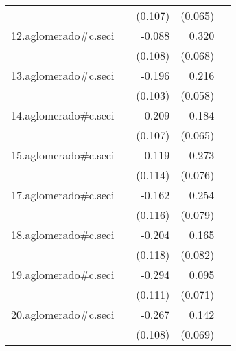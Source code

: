 {\begin{longtable}{l*{4}{D{.}{.}{-1}}}
            &                     &     (0.107)         &     (0.065)         &                     \\
\addlinespace
12.aglomerado#c.seci&                     &      -0.088         &       0.320\sym{***}&                     \\
            &                     &     (0.108)         &     (0.068)         &                     \\
\addlinespace
13.aglomerado#c.seci&                     &      -0.196         &       0.216\sym{***}&                     \\
            &                     &     (0.103)         &     (0.058)         &                     \\
\addlinespace
14.aglomerado#c.seci&                     &      -0.209\sym{*}  &       0.184\sym{**} &                     \\
            &                     &     (0.107)         &     (0.065)         &                     \\
\addlinespace
15.aglomerado#c.seci&                     &      -0.119         &       0.273\sym{***}&                     \\
            &                     &     (0.114)         &     (0.076)         &                     \\
\addlinespace
17.aglomerado#c.seci&                     &      -0.162         &       0.254\sym{**} &                     \\
            &                     &     (0.116)         &     (0.079)         &                     \\
\addlinespace
18.aglomerado#c.seci&                     &      -0.204         &       0.165\sym{*}  &                     \\
            &                     &     (0.118)         &     (0.082)         &                     \\
\addlinespace
19.aglomerado#c.seci&                     &      -0.294\sym{**} &       0.095         &                     \\
            &                     &     (0.111)         &     (0.071)         &                     \\
\addlinespace
20.aglomerado#c.seci&                     &      -0.267\sym{*}  &       0.142\sym{*}  &                     \\
            &                     &     (0.108)         &     (0.069)         &                     \\

\end{longtable}}
